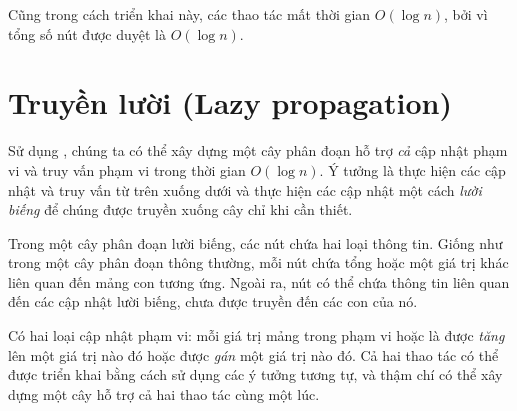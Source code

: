 \begin{center}
\end{center}

Cũng trong cách triển khai này,
các thao tác mất thời gian $O(\log n)$,
bởi vì tổng số nút được duyệt là $O(\log n)$.

\section{Truyền lười (Lazy propagation)}


Sử dụng , chúng ta có thể xây dựng
một cây phân đoạn hỗ trợ \emph{cả} cập nhật phạm vi
và truy vấn phạm vi trong thời gian $O(\log n)$.
Ý tưởng là thực hiện các cập nhật và truy vấn
từ trên xuống dưới và thực hiện các cập nhật
một cách \emph{lười biếng} để chúng được truyền
xuống cây chỉ khi cần thiết.

Trong một cây phân đoạn lười biếng, các nút chứa hai loại
thông tin.
Giống như trong một cây phân đoạn thông thường,
mỗi nút chứa tổng hoặc một giá trị khác
liên quan đến mảng con tương ứng.
Ngoài ra, nút có thể chứa thông tin
liên quan đến các cập nhật lười biếng, chưa được
truyền đến các con của nó.

Có hai loại cập nhật phạm vi:
mỗi giá trị mảng trong phạm vi hoặc là
được \emph{tăng} lên một giá trị nào đó
hoặc được \emph{gán} một giá trị nào đó.
Cả hai thao tác có thể được triển khai bằng cách sử dụng
các ý tưởng tương tự, và thậm chí có thể xây dựng
một cây hỗ trợ cả hai thao tác cùng một lúc.

